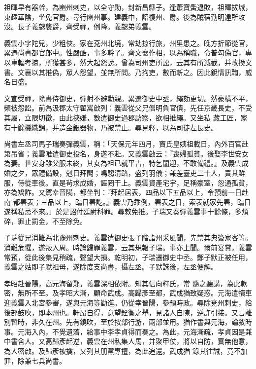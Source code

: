 \begin{pinyinscope}
 祖暉早有器幹，為豳州刺史，以全守勛，封新昌縣子。逢蕭寶夤退敗，祖暉拔城，東趣華陰，坐免官爵。尋行豳州事。建義中，詔復州、爵。後為賊宿勤明達所攻沒。長子義勰襲爵，齊受禪，例降。義勰弟義雲。



 義雲小字陀兒，少粗俠。家在兗州北境，常劫掠行旅，州里患之。晚方折節從官，累遷尚書都官郎中。性嚴酷，事多幹了。齊文襄作相，以為稱職，令普勾偽官，專以車輻考掠，所獲甚多，然大起怨謗。曾為司州吏所訟，云其有所減截，并改換文書。文襄以其推偽，眾人怨望，並無所問。乃拘吏，數而斬之。因此銳情訊鞫，威名日盛。



 文宣受禪，除書侍御史，彈射不避勳親。累選御史中丞，繩劾更切。然豪橫不平，頻被怨訟。前為汲郡太守翟嵩啟列：義雲從父兄僧明負官債，先任京畿長史，不受其屬，立限切徵，由此挾嫌，數遣御史過郡訪察，欲相推繩。又坐私
 藏工匠，家有十餘機織錦，并造金銀器物，乃被禁止。尋見釋，以為司徒左長史。



 尚書左丞司馬子瑞奏彈義雲，稱：「天保元年四月，竇氏皇姨祖載日，內外百官赴第吊省；義雲唯遣御史投名，身遂不赴。又義雲啟云：『喪婦孤貧。後娶李世安女為妻。世安身雖父服未終，其女為祖已就平吉，特乞闇迎，不敢備禮。』及義雲成婚之夕，眾禮備設，剋日拜閣；鳴騶清路，盛列羽儀；兼差臺吏二十人，責其鮮服，侍從車後。直是茍求成婚，誣罔干上。義雲資產宅宇，足稱豪室，忽通孤貧，亦為矯詐。又駕幸晉陽，都坐判：『拜起居表，四品以下五品以上，令預前一日赴南
 都署表；三品以上，臨日署訖。』義雲乃乖例，署表之日，索表就家先署，臨日遂稱私忌不來。」於是詔付廷尉科罪。尋敕免推。子瑞又奏彈義雲事十餘條，多煩碎，罪止罰金，不至除免。



 子瑞從兄消難為北豫州刺史。義雲遣御史張子階詣州采風聞，先禁其典簽家客等。消難危懼，遂叛入周。時論歸罪義雲，云其規報子瑞。事亦上聞。爾前宴賞，義雲常預，從此後集見稍疏，聲望大損。乾明初，子瑞遷御史中丞。鄭子默正被任用，義雲之姑即子默祖母，遂除度支尚書，攝左丞。子默誅後，左丞便解。



 孝昭赴晉陽，高元海留鄴，義雲深相依附。知其信向釋氏，常
 隨之聽講，為此款密，無所不至。及孝昭大漸，顧命武成。高歸彥至都，武成猶致疑惑。元海遣犢車迎義雲入北宮參審，遂與元海等勸進。仍從幸晉陽，參預時政。尋除兗州刺史，給後部鼓吹，即本州也。軒昂自得，意望銓衡之舉，見諸人自陳，逆許引接。又言離別暫時，非久在州。先有鐃吹，至於按部行游，兩部並用。猶作書與元海，論敘時事。元海入內，不覺遺落，給事中李孝貞得而奏之。為此，元海漸疏，孝貞因是兼中書舍人。又高歸彥起逆，義雲在州私集人馬，并聚甲仗，將以自防，實無他意，為人密啟。及歸彥被擒，又列其朋黨專擅，為此追還。武成猶
 錄其往誠，竟不加罪，除兼七兵尚書。




\end{pinyinscope}

